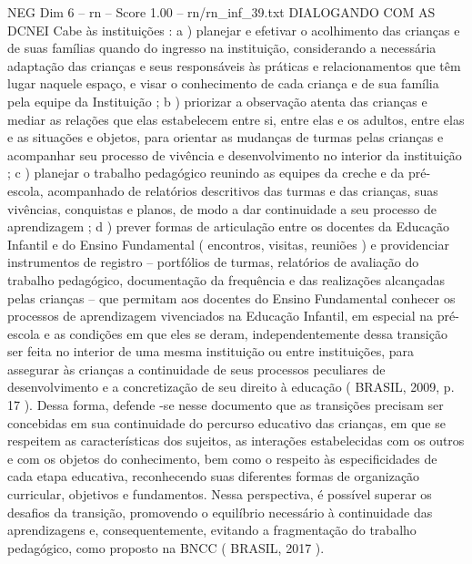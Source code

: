 \begin{textsample}{NEG Dim 6 – rn – Score 1.00 – rn/rn\_inf\_39.txt}  \label{ex:f6_neg_056}
DIALOGANDO COM AS DCNEI Cabe às instituições : a ) planejar e efetivar o acolhimento das crianças e de suas famílias quando do ingresso na instituição, considerando a necessária adaptação das crianças e seus responsáveis às práticas e relacionamentos que têm lugar naquele espaço, e visar o conhecimento de cada criança e de sua família pela equipe da Instituição ; b ) priorizar a observação atenta das crianças e mediar as relações que elas estabelecem entre si, entre elas e os adultos, entre elas e as situações e objetos, para orientar as mudanças de turmas pelas crianças e acompanhar seu processo de vivência e desenvolvimento no interior da instituição ; c ) planejar o trabalho pedagógico reunindo as equipes da creche e da pré-escola, acompanhado de relatórios descritivos das turmas e das crianças, suas vivências, conquistas e planos, de modo a dar continuidade a seu processo de aprendizagem ; d ) prever formas de articulação entre os docentes da Educação Infantil e do Ensino Fundamental ( encontros, visitas, reuniões ) e providenciar instrumentos de registro – portfólios de turmas, relatórios de avaliação do trabalho pedagógico, documentação da frequência e das realizações alcançadas pelas crianças – que permitam aos docentes do Ensino Fundamental conhecer os processos de aprendizagem vivenciados na Educação Infantil, em especial na pré-escola e as condições em que eles se deram, independentemente dessa transição ser feita no interior de uma mesma instituição ou entre instituições, para assegurar às crianças a continuidade de seus processos peculiares de desenvolvimento e a concretização de seu direito à educação ( BRASIL, 2009, p. 17 ).
Dessa forma, defende -se nesse documento que as transições precisam ser concebidas em sua continuidade do percurso educativo das crianças, em que se respeitem as características dos sujeitos, as interações estabelecidas com os outros e com os objetos do conhecimento, bem como o respeito às especificidades de cada etapa educativa, reconhecendo suas diferentes formas de organização curricular, objetivos e fundamentos.
Nessa perspectiva, é possível superar os desafios da transição, promovendo o equilíbrio necessário à continuidade das aprendizagens e, consequentemente, evitando a fragmentação do trabalho pedagógico, como proposto na BNCC ( BRASIL, 2017 ).

\end{textsample}
